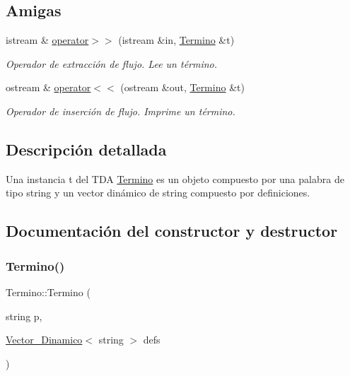 \subsection*{Amigas}
\begin{DoxyCompactItemize}
\item 
istream \& \mbox{\hyperlink{classTermino_a42f635c3609287dbbf2bd65d035fa7f8}{operator$>$$>$}} (istream \&in, \mbox{\hyperlink{classTermino}{Termino}} \&t)
\begin{DoxyCompactList}\small\item\em Operador de extracción de flujo. Lee un término. \end{DoxyCompactList}\item 
ostream \& \mbox{\hyperlink{classTermino_a07bb15b9ddaa8cfc098576d47a7f9034}{operator$<$$<$}} (ostream \&out, \mbox{\hyperlink{classTermino}{Termino}} \&t)
\begin{DoxyCompactList}\small\item\em Operador de inserción de flujo. Imprime un término. \end{DoxyCompactList}\end{DoxyCompactItemize}


\subsection{Descripción detallada}
Una instancia t del T\+DA \mbox{\hyperlink{classTermino}{Termino}} es un objeto compuesto por una palabra de tipo string y un vector dinámico de string compuesto por definiciones. 

\subsection{Documentación del constructor y destructor}
\mbox{\label{classTermino_ab5f1715d66001733400d30345af815aa}} 
\subsubsection{\texorpdfstring{Termino()}{Termino()}\hspace{0.1cm}{\footnotesize\ttfamily [1/2]}}
{\footnotesize\ttfamily Termino\+::\+Termino (\begin{DoxyParamCaption}\item[{string}]{p,  }\item[{\mbox{\hyperlink{classVector__Dinamico}{Vector\+\_\+\+Dinamico}}$<$ string $>$}]{defs }\end{DoxyParamCaption})}



